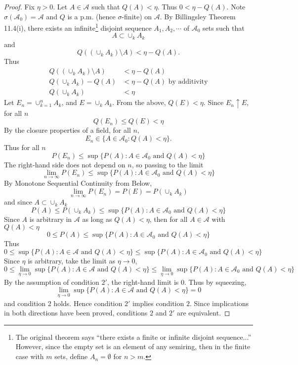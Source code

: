 \documentclass[letterpaper, 12pt]{article}
\newcommand{\cA}{\mathcal{A}}
\begin{document}
\begin{proof}
Fix $\eta > 0$. Let $A \in \cA$ such that $Q(A) < \eta$. Thus $0 < \eta - Q(A)$. Note $\sigma(\cA_0) = \cA$ and $Q$ is a p.m. (hence $\sigma$-finite) on $\cA$. By Billingsley Theorem 11.4(i), there exists an infinite\footnote{
The original theorem says ``there exists a finite or infinite disjoint sequence...'' However, since the empty set is an element of any semiring, then in the finite case with $m$ sets, define $A_n = \emptyset$ for $n > m$.
} disjoint sequence $A_1, A_2, \cdots$ of $\cA_0$ sets such that 
\[
A \subset \cup_k A_k
\] 
and 
\[
Q((\cup_k A_k) \setminus A) < \eta - Q(A).
\]
Thus
\begin{align*}
Q((\cup_k A_k) \setminus A) &< \eta - Q(A) 
\\
Q(\cup_k A_k) - Q( A) &< \eta - Q(A)  
\text{ by additivity}
\\
Q(\cup_k A_k)  &< \eta 
\end{align*}
Let $E_n = \cup_{k=1}^n A_k$, and $E = \cup_k A_k$. From the above, $Q(E) < \eta$. Since $E_n \uparrow E$, for all $n$ 
\[
Q(E_n) \leq Q(E) < \eta
\]
By the closure properties of a field, for all $n$, 
\[
E_n \in \{A \in \cA_0 : Q(A) < \eta\}.
\]
Thus for all $n$
\[
P(E_n) \leq \sup\{P(A) : A \in \cA_0 \text{ and } Q(A) < \eta\}
\]
The right-hand side does not depend on $n$, so passing to the limit
\[
\lim_{n \to \infty} P(E_n) \leq \sup\{P(A) : A \in \cA_0 \text{ and } Q(A) < \eta\}
\]
By Monotone Sequential Continuity from Below,
\[
\lim_{n \to \infty} P(E_n) = P(E) = P(\cup_k A_k)
\]
and since $A \subset \cup_k A_k$
\[
P(A) \leq P(\cup_k A_k) \leq \sup\{P(A) : A \in \cA_0 \text{ and } Q(A) < \eta\}
\]
Since $A$ is arbitrary in $\cA$ as long as $Q(A) < \eta$, then for all $A \in \cA$ with $Q(A) < \eta$
\[
0 \leq
P(A) \leq \sup\{P(A) : A \in \cA_0 \text{ and } Q(A) < \eta\}
\]
Thus
\[
0 \leq 
\sup \{P(A) : A \in \cA \text{ and } Q(A) < \eta\}
\leq
\sup \{P(A) : A \in \cA_0 \text{ and } Q(A) < \eta\}
\]
Since $\eta$ is arbitrary, take the limit as $\eta \to 0$,
\[
0 \leq 
\lim_{\eta \to 0} \sup \{P(A) : A \in \cA \text{ and } Q(A) < \eta\}
\leq 
\lim_{\eta \to 0}
\sup \{P(A) : A \in \cA_0 \text{ and } Q(A) < \eta\}
\]
By the assumption of condition $2'$, the right-hand limit is 0. Thus by squeezing,
\[
\lim_{\eta \to 0} \sup \{P(A) : A \in \cA \text{ and } Q(A) < \eta\}
=
0
\]
and condition 2 holds. Hence condition $2'$ implies condition $2$. Since implications in both directions have been proved, conditions $2$ and $2'$ are equivalent.
\end{proof}
\end{document}
